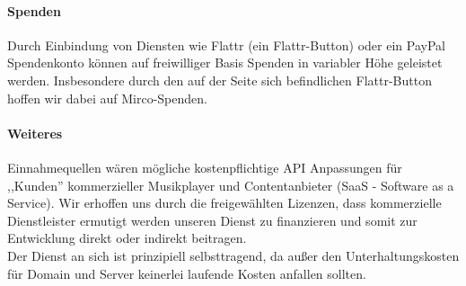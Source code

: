 \paragraph{Spenden} Durch Einbindung von Diensten wie Flattr (ein
Flattr-Button) oder ein PayPal Spendenkonto können auf freiwilliger Basis
Spenden in variabler Höhe geleistet werden. Insbesondere durch den auf der Seite
sich befindlichen Flattr-Button hoffen wir dabei auf Mirco-Spenden.
\\
\paragraph{Weiteres} Einnahmequellen wären mögliche kostenpflichtige API
Anpassungen für ,,Kunden'' kommerzieller Musikplayer und Contentanbieter (SaaS -
Software as a Service). Wir
erhoffen uns durch die freigewählten Lizenzen, dass kommerzielle Dienstleister
ermutigt werden unseren Dienst zu finanzieren und somit zur Entwicklung direkt
oder indirekt beitragen.
\\
Der Dienst an sich ist prinzipiell selbsttragend, da außer den
Unterhaltungskosten für Domain und Server keinerlei laufende Kosten anfallen sollten.
